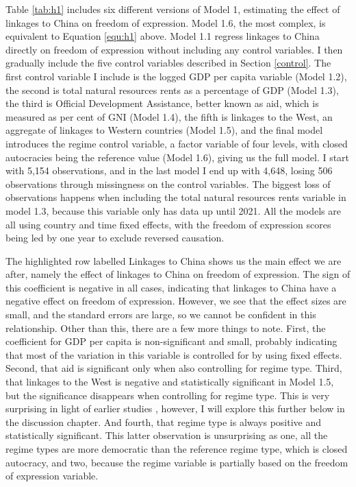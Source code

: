 Table \ref{tab:h1} includes six different versions of Model 1, estimating the effect of linkages to China on freedom of expression. Model 1.6, the most complex, is equivalent to Equation \ref{equ:h1} above. Model 1.1 regress linkages to China directly on freedom of expression without including any control variables. I then gradually include the five control variables described in Section \ref{control}. The first control variable I include is the logged GDP per capita variable (Model 1.2), the second is total natural resources rents as a percentage of GDP (Model 1.3), the third is Official Development Assistance, better known as aid, which is measured as per cent of GNI (Model 1.4), the fifth is linkages to the West, an aggregate of linkages to Western countries (Model 1.5), and the final model introduces the regime control variable, a factor variable of four levels, with closed autocracies being the reference value (Model 1.6), giving us the full model.  I start with 5,154 observations, and in the last model I end up with 4,648, losing 506 observations through missingness on the control variables. The biggest loss of observations happens when including the total natural resources rents variable in model 1.3, because this variable only has data up until 2021. All the models are all using country and time fixed effects, with the freedom of expression scores being led by one year to exclude reversed causation. 

The highlighted row labelled Linkages to China shows us the main effect we are after, namely the effect of linkages to China on freedom of expression. The sign of this coefficient is negative in all cases, indicating that linkages to China have a negative effect on freedom of expression. However, we see that the effect sizes are small, and the standard errors are large, so we cannot be confident in this relationship. Other than this, there are a few more things to note. First, the coefficient for GDP per capita is non-significant and small, probably indicating that most of the variation in this variable is controlled for by using fixed effects. Second, that aid is significant only when also controlling for regime type. Third, that linkages to the West is negative and statistically significant in Model 1.5, but the significance disappears when controlling for regime type. This is very surprising in light of earlier studies \citep{levitsky_linkage_2006}, however, I will explore this further below in the discussion chapter. And fourth, that regime type is always positive and statistically significant. This latter observation is unsurprising as one, all the regime types are more democratic than the reference regime type, which is closed autocracy, and two, because the regime variable is partially based on the freedom of expression variable.

